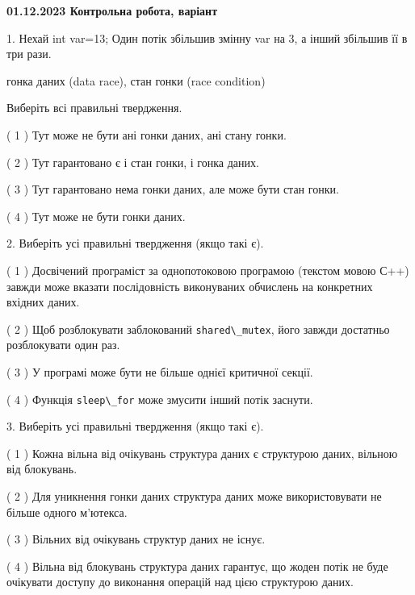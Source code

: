 \documentclass[12pt, ukrainian]{article}
\def\code#1{\Verb!#1!}
\begin{document}
\vspace{4mm}
\newpage
\begin {large}

\textbf{01.12.2023 Контрольна робота, варіант  }\par


{
1. Нехай int var=13; Один потік збільшив змінну var на 3, а інший збільшив її в три рази.

гонка даних (data race), стан гонки (race condition)

Виберіть всі правильні твердження.\par
\vspace{2mm}
( 1 ) Тут може не бути ані гонки даних, ані стану гонки.%

( 2 ) Тут гарантовано є і стан гонки, і гонка даних.%

( 3 ) Тут гарантовано нема гонки даних, але може бути стан гонки.%

( 4 ) Тут може не бути гонки даних.%


\vspace{5mm}
2. Виберіть усі правильні твердження (якщо такі є).\par
\vspace{2mm}

( 1 ) Досвічений програміст за однопотоковою програмою (текстом мовою С++) завжди може вказати послідовність виконуваних обчислень на конкретних вхідних даних.%

( 2 ) Щоб розблокувати заблокований \code{shared\_mutex}, його завжди достатньо розблокувати один раз.%

( 3 ) У програмі може бути не більше однієї критичної секції.%

( 4 ) Функція \code{sleep\_for} може змусити інший потік заснути.%


\vspace{5mm}
3. Виберіть усі правильні твердження (якщо такі є).\par
\vspace{2mm}

( 1 ) Кожна вільна від очікувань структура даних є структурою даних, вільною від блокувань.%

( 2 ) Для уникнення гонки даних структура даних може використовувати не більше одного м’ютекса.%

( 3 ) Вільних від очікувань структур даних не існує.%

( 4 ) Вільна від блокувань структура даних гарантує, що жоден потік не буде очікувати доступу до виконання операцій над цією структурою даних.%


}
\end{large}
\end{document}
